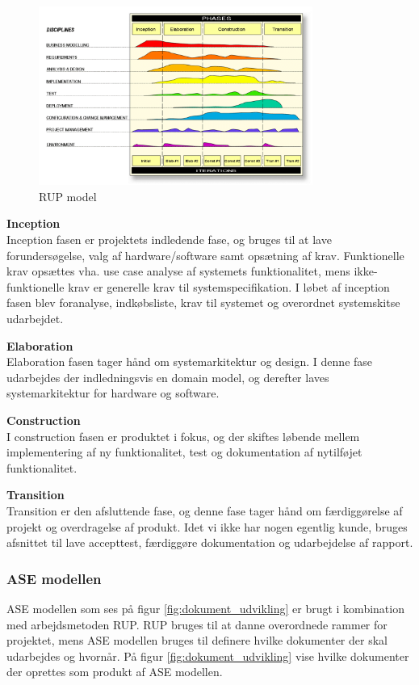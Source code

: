 \begin{figure}[H]
	\centering
	\includegraphics[width=0.80\textwidth]{Billeder/Udviklingsproces/RUP}
	\caption{RUP model}
	\label{fig:rup}
\end{figure}

\textbf{Inception}\\
Inception fasen er projektets indledende fase, og bruges til at lave forundersøgelse, valg af hardware/software samt opsætning af krav. Funktionelle krav opsættes vha. use case analyse af systemets funktionalitet, mens ikke-funktionelle krav er generelle krav til systemspecifikation.
I løbet af inception fasen blev foranalyse, indkøbsliste, krav til systemet og overordnet systemskitse udarbejdet. 

\textbf{Elaboration}\\
Elaboration fasen tager hånd om systemarkitektur og design. I denne fase udarbejdes der indledningsvis en domain model, og derefter laves systemarkitektur for hardware og software. 

\textbf{Construction}\\
I construction fasen er produktet i fokus, og der skiftes løbende mellem implementering af ny funktionalitet, test og dokumentation af nytilføjet funktionalitet. 

\textbf{Transition}\\
Transition er den afsluttende fase, og denne fase tager hånd om færdiggørelse af projekt og overdragelse af produkt. Idet vi ikke har nogen egentlig kunde, bruges afsnittet til lave accepttest, færdiggøre dokumentation og udarbejdelse af rapport. 

\newpage

\subsubsection*{ASE modellen}
ASE modellen som ses på figur \ref{fig:dokument_udvikling} er brugt i kombination med arbejdsmetoden RUP. RUP bruges til at danne overordnede rammer for projektet, mens ASE modellen bruges til definere hvilke dokumenter der skal udarbejdes og hvornår. På figur \ref{fig:dokument_udvikling} vise hvilke dokumenter der oprettes som produkt af ASE modellen. 

